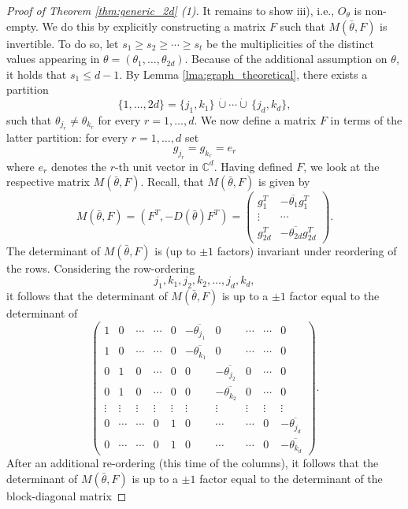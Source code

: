 \documentclass[reqno,a4paper,11pt]{amsart}
\numberwithin{equation}{section}
\def\C{{\mathbb C}}
\newcommand\1{\mathds{1}}
\begin{document}
\begin{proof}[Proof of Theorem \ref{thm:generic_2d} (1)]
It remains to show iii), i.e., $O_\theta$ is non-empty. We do this by explicitly constructing a matrix $F$ such that $M(\bar{\theta},F)$ is invertible. To do so, let $s_1 \geq s_2 \geq \cdots \geq s_t$ be the multiplicities of the distinct values appearing in $\theta=(\theta_1, \dots, \theta_{2d})$. Because of the additional assumption on $\theta$, it holds that $s_1\leq d-1$.
By Lemma \ref{lma:graph_theoretical}, there exists a partition
$$
\{ 1,\dots, 2d \} = \{ j_1, k_1 \} \, \dot{\cup} \cdots \dot{\cup} \, \{ j_d, k_d \},
$$
such that $\theta_{j_r} \neq \theta_{k_r}$ for every $r = 1, \dots, d$. We now define a matrix $F$ in terms of the latter partition: for every $r =1,\dots,d$ set
$$
g_{j_r} = g_{k_r} = e_r
$$
where $e_r$ denotes the $r$-th unit vector in $\C^d$. Having defined $F$, we look at the respective matrix $M(\bar{\theta},F)$. Recall, that $M(\bar{\theta},F)$ is given by
$$
M(\bar{\theta},F) = \left ( F^{T} , -D(\bar{\theta}) F^T \right ) = \begin{pmatrix}
    g_1^T & -\overline{\theta_1} g_1^T \\
    \vdots & \cdots \\
    g_{2d}^T & -\overline{\theta_{2d}} g_{2d}^T
\end{pmatrix}.
$$
The determinant of $M(\bar{\theta},F)$ is (up to $\pm 1$ factors) invariant under reordering of the rows. Considering the row-ordering
$$
j_1,k_1,j_2,k_2,\dots, j_d,k_d,
$$
it follows that the determinant of $M(\bar{\theta},F)$ is up to a $\pm 1$ factor equal to the determinant of
$$
\begin{pmatrix}
    1 & 0 & \cdots & \cdots & 0 & -\overline{\theta_{j_1}} & 0 & \cdots & \cdots & 0 \\
    1 & 0 & \cdots & \cdots & 0 & -\overline{\theta_{k_1}} & 0 & \cdots & \cdots & 0 \\
    0 & 1 & 0 & \cdots & 0 & 0 & -\overline{\theta_{j_2}}  & 0 & \cdots & 0 \\
    0 & 1 & 0 & \cdots & 0 & 0 & -\overline{\theta_{k_2}}  & 0 & \cdots & 0 \\
    \vdots & \vdots & \vdots & \vdots & \vdots & \vdots & \vdots  & \vdots & \vdots & \vdots \\
    0 & \cdots & \cdots & 0 & 1 & 0 & \cdots  & \cdots & 0 & -\overline{\theta_{j_d}} \\
    0 & \cdots & \cdots & 0 & 1 & 0 & \cdots  & \cdots & 0 & -\overline{\theta_{k_d}}
\end{pmatrix}.
$$
After an additional re-ordering (this time of the columns), it follows that the determinant of $M(\bar{\theta},F)$ is up to a $\pm 1$ factor equal to the determinant of the block-diagonal matrix

\end{proof}
\end{document}
